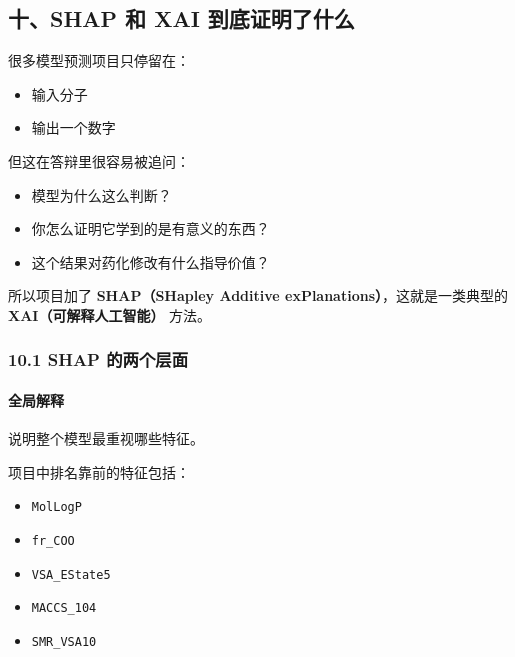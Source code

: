 \documentclass[
  ,
]{ctexart}
\providecommand{\tightlist}{%
  \setlength{\itemsep}{0pt}\setlength{\parskip}{0pt}}
\begin{document}
\hypertarget{ux5341shap-ux548c-xai-ux5230ux5e95ux8bc1ux660eux4e86ux4ec0ux4e48}{%
\subsection{十、SHAP 和 XAI
到底证明了什么}\label{ux5341shap-ux548c-xai-ux5230ux5e95ux8bc1ux660eux4e86ux4ec0ux4e48}}

很多模型预测项目只停留在：

\begin{itemize}
\tightlist
\item
  输入分子
\item
  输出一个数字
\end{itemize}

但这在答辩里很容易被追问：

\begin{itemize}
\tightlist
\item
  模型为什么这么判断？
\item
  你怎么证明它学到的是有意义的东西？
\item
  这个结果对药化修改有什么指导价值？
\end{itemize}

所以项目加了 \textbf{SHAP（SHapley Additive
exPlanations）}，这就是一类典型的 \textbf{XAI（可解释人工智能）} 方法。

\hypertarget{shap-ux7684ux4e24ux4e2aux5c42ux9762}{%
\subsubsection{10.1 SHAP
的两个层面}\label{shap-ux7684ux4e24ux4e2aux5c42ux9762}}

\hypertarget{ux5168ux5c40ux89e3ux91ca}{%
\paragraph{全局解释}\label{ux5168ux5c40ux89e3ux91ca}}

说明整个模型最重视哪些特征。

项目中排名靠前的特征包括：

\begin{itemize}
\tightlist
\item
  \texttt{MolLogP}
\item
  \texttt{fr\_COO}
\item
  \texttt{VSA\_EState5}
\item
  \texttt{MACCS\_104}
\item
  \texttt{SMR\_VSA10}
\end{itemize}
\end{document}
